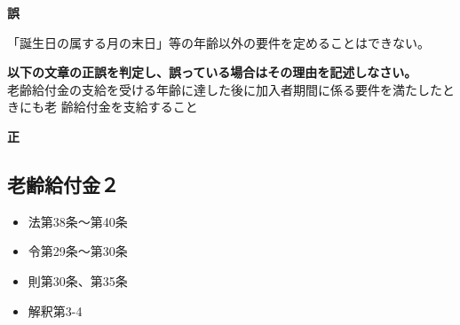 \begin{answerbox}
  \textbf{誤}

  「誕生日の属する月の末日」等の年齢以外の要件を定めることはできない。
\end{answerbox}

\begin{truefalse}[年金1 2025 問題1(3)エ\textcircled{2}]
\textbf{以下の文章の正誤を判定し、誤っている場合はその理由を記述しなさい。}
  \\

老齢給付金の支給を受ける年齢に達した後に加入者期間に係る要件を満たしたときにも老
齢給付金を支給すること
\end{truefalse}

\begin{answerbox}
  \textbf{正}
\end{answerbox}


\newpage

\subsection{老齢給付金２}


\begin{InyouJobunbox}
  \begin{itemize}
    \item 法第38条〜第40条
    \item 令第29条〜第30条
    \item 則第30条、第35条
    \item 解釈第3-4
  \end{itemize}
\end{InyouJobunbox}


